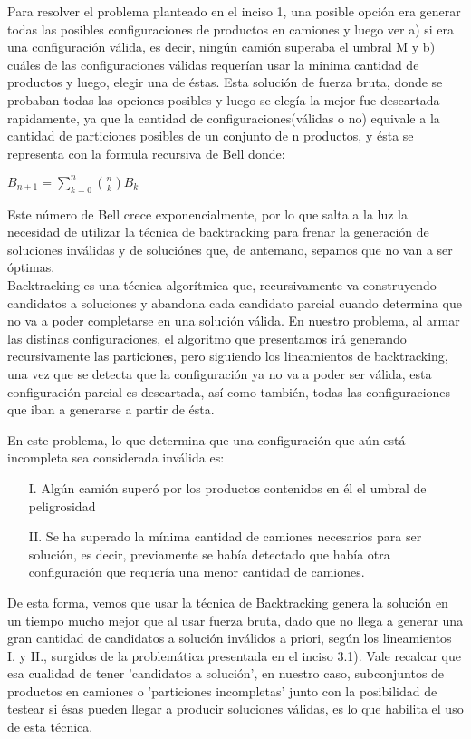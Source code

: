 Para resolver el problema planteado en el inciso 1, una posible opción era generar todas las posibles configuraciones de productos en camiones y luego ver a) si era una configuración válida, es decir, ningún camión superaba el umbral M y b) cuáles de las configuraciones válidas requerían usar la minima cantidad de productos y luego, elegir una de éstas.\newline
\indent Esta solución de fuerza bruta, donde se probaban todas las opciones posibles y luego se elegía la mejor fue descartada rapidamente, ya que la cantidad de configuraciones(válidas o no) equivale a la cantidad de particiones posibles de un conjunto de n productos, y ésta se representa con la formula recursiva de Bell donde:

$B_{n+1} = \sum\limits_{k=0}^n \binom {n} {k}B_k$

\noindent Este número de Bell crece exponencialmente, por lo que salta a la luz la necesidad de utilizar la técnica de backtracking para frenar la generación de soluciones inválidas y de soluciónes que, de antemano, sepamos que no van a ser óptimas.\\
\indent Backtracking es una técnica algorítmica que, recursivamente va construyendo candidatos a soluciones y abandona cada candidato parcial cuando determina que no va a poder completarse en una solución válida. En nuestro problema, al armar las distinas configuraciones, el algoritmo que presentamos irá generando recursivamente las particiones, pero siguiendo los lineamientos de backtracking, una vez que se detecta que la configuración ya no va a poder ser válida, esta configuración parcial es descartada, así como también, todas las configuraciones que iban a generarse a partir de ésta.

\bigskip
En este problema, lo que determina que una configuración que aún está incompleta sea considerada inválida es:
\begin{enumerate}

\item[I.] Algún camión superó por los productos contenidos en él el umbral de peligrosidad
\item[II.] Se ha superado la mínima cantidad de camiones necesarios para ser solución, es decir, previamente se había detectado que había otra configuración que requería una menor cantidad de camiones.

\end{enumerate}

De esta forma, vemos que usar la técnica de Backtracking genera la solución en un tiempo mucho mejor que al usar fuerza bruta, dado que no llega a generar una gran cantidad de candidatos a solución inválidos a priori, según los lineamientos I. y II., surgidos de la problemática presentada en el inciso 3.1). Vale recalcar que esa cualidad de tener 'candidatos a solución', en nuestro caso, subconjuntos de productos en camiones o 'particiones incompletas' junto con la posibilidad de testear si ésas pueden llegar a producir soluciones válidas, es lo que habilita el uso de esta técnica.

